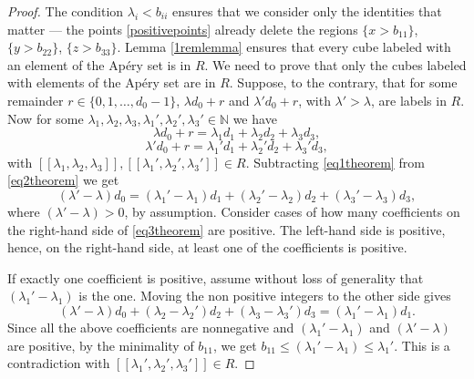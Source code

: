 \documentclass[12pt]{article}
\theoremstyle{remark}
\begin{document}
\begin{proof}
The condition $\lambda_i < b_{ii}$ ensures that we consider only the identities that matter --- the points \eqref{positivepoints} already delete the regions $\{x > b_{11}\}$, $\{y > b_{22}\}$, $\{z > b_{33}\}$. Lemma \ref{1remlemma} ensures that every cube labeled with an element of the Ap{\'e}ry set is in $R$. We need to prove that only the cubes labeled with elements of the Ap{\'e}ry set are in $R$. Suppose, to the contrary, that for some remainder $r \in \{0,1,\dots,d_0-1\}$, $\lambda d_0 + r$ and $\lambda' d_0 + r$, with $\lambda' > \lambda$, are labels in $R$. Now for some $\lambda_1, \lambda_2, \lambda_3,\lambda_1', \lambda_2', \lambda_3' \in \mathbb{N}$ we have
    \begin{equation}\label{eq1theorem}
        \lambda d_0 + r = \lambda_1d_1 + \lambda_2d_2 + \lambda_3d_3,
    \end{equation}
     \begin{equation}\label{eq2theorem}
        \lambda' d_0 + r = \lambda_1'd_1 + \lambda_2'd_2 + \lambda_3'd_3,
    \end{equation}
    with $[[\lambda_1,\lambda_2,\lambda_3]], [[\lambda_1',\lambda_2',\lambda_3']] \in R$.
    Subtracting \eqref{eq1theorem} from \eqref{eq2theorem} we get
    \begin{equation}\label{eq3theorem}
        (\lambda' - \lambda)d_0 = (\lambda_1' - \lambda_1)d_1 + (\lambda_2' - \lambda_2)d_2 + (\lambda_3' - \lambda_3)d_3,
    \end{equation}
    where $(\lambda' - \lambda)>0$, by assumption. Consider cases of how many coefficients on the right-hand side of \eqref{eq3theorem} are positive. The left-hand side is positive, hence, on the right-hand side, at least one of the coefficients is positive. 
    
If exactly one coefficient is positive, assume without loss of generality that $(\lambda_1' - \lambda_1)$ is the one. Moving the non positive integers to the other side gives
    \begin{equation}\label{eq4theorem}
        (\lambda' - \lambda)d_0  + (\lambda_2 - \lambda_2')d_2 + (\lambda_3 - \lambda_3')d_3= (\lambda_1' - \lambda_1)d_1.
    \end{equation} 
Since all the above coefficients are nonnegative and $(\lambda_1' - \lambda_1)$ and $(\lambda' - \lambda) $ are positive, by the minimality of $b_{11}$, we get $b_{11} \leq (\lambda_1' - \lambda_1) \leq \lambda_1'$. This is a contradiction with $[[\lambda_1',\lambda_2',\lambda_3']] \in R$.


\end{proof}
\end{document}
